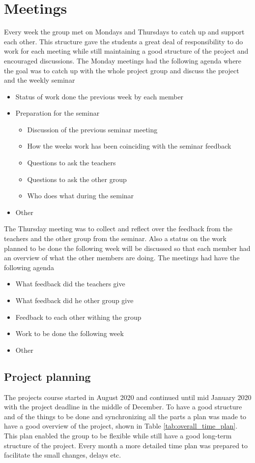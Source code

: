 \section*{Meetings}
Every week the group met on Mondays and Thursdays to catch up and support each other. This structure gave the students a great deal of responsibility to do work for each meeting while still maintaining a good structure of the project and encouraged discussions. 
The Monday meetings had the following agenda where the goal was to catch up with the whole project group and discuss the project and the weekly seminar
\begin{itemize}
    \item Status of work done the previous week by each member
    \item Preparation for the seminar
    \begin{itemize}
        \item Discussion of the previous seminar meeting
        \item How the weeks work has been coinciding with the seminar feedback
        \item Questions to ask the teachers
        \item Questions to ask the other group
        \item Who does what during the seminar
    \end{itemize}
    \item Other
\end{itemize}
The Thursday meeting was to collect and reflect over the 
feedback from the teachers and the other group from the seminar. Also a status on the work planned to be done the following week will be discussed so that each member had an overview of what the other members are doing. The meetings had have the following agenda
\begin{itemize}
    \item What feedback did the teachers give
    \item What feedback did he other group give 
    \item Feedback to each other withing the group
    \item Work to be done the following week
    \item Other 
\end{itemize}

\subsection{Project planning}
The projects course started in August 2020 and continued until mid January 2020 with the project deadline in the middle of December. To have a good structure and of the things to be done and synchronizing all the parts a plan was made to have a good overview of the project, shown in Table \ref{tab:overall_time_plan}. This plan enabled the group to be flexible while still have a good long-term structure of the project. Every month a more detailed time plan was prepared to facilitate the small changes, delays etc. 


